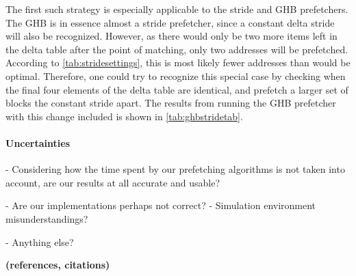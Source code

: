 The first such strategy is especially applicable to the stride and GHB
prefetchers. The GHB is in essence almost a stride prefetcher, since a
constant delta stride will also be recognized. However, as there would
only be two more items left in the delta table after the point of
matching, only two addresses will be prefetched. According to
\autoref{tab:stridesettings}, this is most likely fewer addresses than
would be optimal. Therefore, one could try to recognize this special
case by checking when the final four elements of the delta table are
identical, and prefetch a larger set of blocks the constant stride
apart. The results from running the GHB prefetcher with this change
included is shown in \autoref{tab:ghbstridetab}.

\paragraph{Uncertainties}
\label{"waiting for reftex-label call..."}

- Considering how the time spent by our prefetching algorithms is not
taken into account, are our results at all accurate and usable?

- Are our implementations perhaps not correct?
- Simulation environment misunderstandings?

- Anything else?

{\bf (references, citations)}
